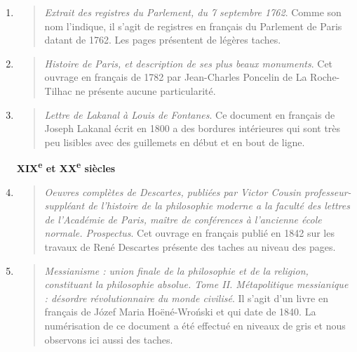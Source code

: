 \documentclass[a4paper,12pt,twoside]{book}
\begin{document}
\begin{enumerate}
\begin{quote}
\end{quote}	
\item
\begin{quote}
	
	\emph{Extrait des registres du Parlement, du 7 septembre 1762}. Comme son nom l'indique, il s'agit de registres en français du Parlement de Paris datant de 1762. Les pages présentent de légères taches.
	
\end{quote}	
\item
\begin{quote}
	
	\emph{Histoire de Paris, et description de ses plus beaux monuments}.
	Cet ouvrage en français de 1782 par Jean-Charles         
	Poncelin de La Roche-Tilhac ne présente aucune particularité.
	
\end{quote}	
\item
\begin{quote}
	
	\emph{Lettre de Lakanal à Louis de Fontanes}.
	Ce document en français de Joseph Lakanal écrit en 1800 a des bordures intérieures qui sont très peu lisibles avec des guillemets en début et en bout de ligne. \\
	
	\end{quote}	

	
	
	\textbf{XIX\textsuperscript{e} et XX\textsuperscript{e} siècles} \\
	

		
	\item
	\begin{quote}
	
	\emph{Oeuvres complètes de Descartes, publiées par Victor Cousin professeur-suppléant de l'histoire de la philosophie moderne a la faculté des lettres de l'Académie de Paris, maître de conférences à l'ancienne école normale. Prospectus}.
	Cet ouvrage en français publié en 1842 sur les travaux de René Descartes présente des taches au niveau des pages.
	
\end{quote}	
\item
\begin{quote}
	
	\emph{Messianisme : union finale de la philosophie et de la religion, constituant la philosophie absolue. Tome II. Métapolitique messianique : désordre révolutionnaire du monde civilisé}.
	Il s'agit d'un livre en français de Józef Maria Hoëné-Wroński et qui date de 1840. La numérisation de ce document a été effectué en niveaux de gris et nous observons ici aussi des taches.
	

\end{quote}
\end{enumerate}
\end{document}
